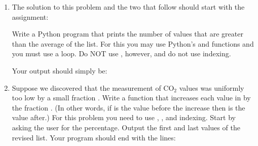 \documentclass[letterpaper,10pt,english]{sphinxmanual}
\begin{document}
\begin{enumerate}
\begin{sphinxVerbatim}[commandchars=\\\{\}]
\PYG{p}{[}\PYG{p}{]} \PYG{p}{[}\PYG{p}{]} 
\PYG{p}{[}\PYG{p}{]} \PYG{p}{[}\PYG{p}{]} 
\PYG{p}{[}\PYG{p}{]} \PYG{p}{[}\PYG{p}{]} 
\end{sphinxVerbatim}

\item {} 
The solution to this problem and the two that follow should start
with the assignment:

\begin{sphinxVerbatim}[commandchars=\\\{\}]
  \PYG{p}{[}      \PYGZbs{}
                     \PYG{p}{]}
\end{sphinxVerbatim}

Write a Python program that prints the number of values that are greater
than the average of the list.  For this you may use Python’s
 and  functions and you must use a  loop. Do
NOT use , however, and do not use indexing.

Your output should simply be:

\begin{sphinxVerbatim}[commandchars=\\\{\}]
 
   
\end{sphinxVerbatim}

\item {} 
Suppose we discovered that the measurement of CO$_{\text{2}}$ values was
uniformly too low by a small fraction . Write a function that
increases each value in  by the fraction . (In
other words, if  is the value before the increase then
 is the value after.) For this problem you need to use
, , and indexing. Start by asking the user for the
percentage. Output the first and last values of the revised list.
Your program should end with the lines:


\end{enumerate}
\end{document}
